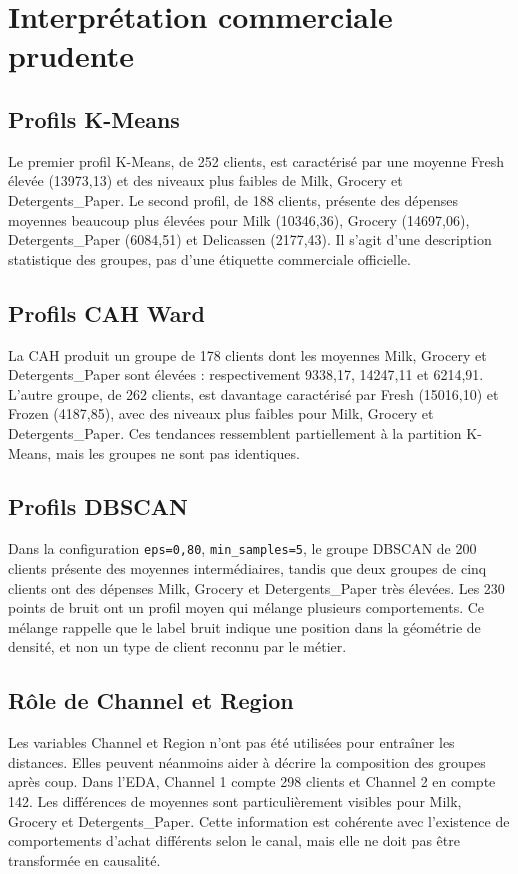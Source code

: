 \chapter{Interprétation commerciale prudente}

\section{Profils K-Means}
Le premier profil K-Means, de 252 clients, est caractérisé par une moyenne Fresh élevée (13973,13) et des niveaux plus faibles de Milk, Grocery et Detergents\_Paper. Le second profil, de 188 clients, présente des dépenses moyennes beaucoup plus élevées pour Milk (10346,36), Grocery (14697,06), Detergents\_Paper (6084,51) et Delicassen (2177,43). Il s'agit d'une description statistique des groupes, pas d'une étiquette commerciale officielle.

\section{Profils CAH Ward}
La CAH produit un groupe de 178 clients dont les moyennes Milk, Grocery et Detergents\_Paper sont élevées : respectivement 9338,17, 14247,11 et 6214,91. L'autre groupe, de 262 clients, est davantage caractérisé par Fresh (15016,10) et Frozen (4187,85), avec des niveaux plus faibles pour Milk, Grocery et Detergents\_Paper. Ces tendances ressemblent partiellement à la partition K-Means, mais les groupes ne sont pas identiques.

\section{Profils DBSCAN}
Dans la configuration \texttt{eps=0,80}, \texttt{min\_samples=5}, le groupe DBSCAN de 200 clients présente des moyennes intermédiaires, tandis que deux groupes de cinq clients ont des dépenses Milk, Grocery et Detergents\_Paper très élevées. Les 230 points de bruit ont un profil moyen qui mélange plusieurs comportements. Ce mélange rappelle que le label bruit indique une position dans la géométrie de densité, et non un type de client reconnu par le métier.


\section{Rôle de Channel et Region}
Les variables Channel et Region n'ont pas été utilisées pour entraîner les distances. Elles peuvent néanmoins aider à décrire la composition des groupes après coup. Dans l'EDA, Channel 1 compte 298 clients et Channel 2 en compte 142. Les différences de moyennes sont particulièrement visibles pour Milk, Grocery et Detergents\_Paper. Cette information est cohérente avec l'existence de comportements d'achat différents selon le canal, mais elle ne doit pas être transformée en causalité.

